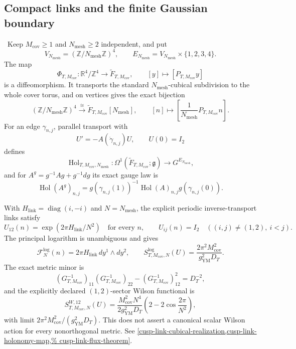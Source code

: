 \subsection{Compact links and the finite Gaussian boundary}

\begin{auditrecord}
\Verified\ Keep \(M_{\mathrm{cov}}\geq1\) and
\(N_{\mathrm{mesh}}\geq2\) independent, and put
\[
 V_{N_{\mathrm{mesh}}}=(\mathbb Z/N_{\mathrm{mesh}}\mathbb Z)^4,
 \qquad
 E_{N_{\mathrm{mesh}}}=V_{N_{\mathrm{mesh}}}\times\{1,2,3,4\}.
\]
The map
\[
 \Phi_{T,M_{\mathrm{cov}}}:\mathbb R^4/\mathbb Z^4
 \longrightarrow\widetilde F_{T,M_{\mathrm{cov}}},\qquad
 [y]\longmapsto[P_{T,M_{\mathrm{cov}}}y]
\]
is a diffeomorphism.  It transports the standard \(N_{\mathrm{mesh}}\)-cubical
subdivision to the whole cover torus, and on vertices gives the exact
bijection
\[
 (\mathbb Z/N_{\mathrm{mesh}}\mathbb Z)^4
 \xrightarrow{\ \cong\ }
 \widetilde F_{T,M_{\mathrm{cov}}}[N_{\mathrm{mesh}}],\qquad
 [n]\longmapsto
 \left[\frac1{N_{\mathrm{mesh}}}P_{T,M_{\mathrm{cov}}}n\right].
\]
For an edge \(\gamma_{n,j}\), parallel transport with
\[
 U'=-A(\dot\gamma_{n,j})U,\qquad U(0)=I_2
\]
defines
\[
 \operatorname{Hol}_{T,M_{\mathrm{cov}},N_{\mathrm{mesh}}}:
 \Omega^1(\widetilde F_{T,M_{\mathrm{cov}}};\mathfrak g)
 \longrightarrow G^{E_{N_{\mathrm{mesh}}}},
\]
and for \(A^g=g^{-1}Ag+g^{-1}dg\) its exact gauge law is
\[
 \operatorname{Hol}(A^g)_{n,j}
 =g(\gamma_{n,j}(1))^{-1}\operatorname{Hol}(A)_{n,j}
  g(\gamma_{n,j}(0)).
\]

With \(H_{\mathrm{link}}=\operatorname{diag}(i,-i)\) and
\(N=N_{\mathrm{mesh}}\), the explicit
periodic inverse-transport links satisfy
\[
 U_{12}(n)=\exp(2\pi H_{\mathrm{link}}/N^2)
 \quad\text{for every }n,
 \qquad U_{ij}(n)=I_2\quad((i,j)\ne(1,2),\ i<j).
\]
The principal logarithm is unambiguous and gives
\[
 \mathcal F_N^{\log}(n)=2\pi H_{\mathrm{link}}\,dy^1\wedge dy^2,
 \qquad
 S^{\log}_{T,M_{\mathrm{cov}},N}(U)
 =\frac{2\pi^2M_{\mathrm{cov}}^2}{g_{\mathrm{YM}}^2D_T}.
\]
The exact metric minor is
\[
 (G_{T,M_{\mathrm{cov}}}^{-1})_{11}
 (G_{T,M_{\mathrm{cov}}}^{-1})_{22}
 -(G_{T,M_{\mathrm{cov}}}^{-1})_{12}^2=D_T^{-2},
\]
and the explicitly declared \((1,2)\)-sector Wilson functional is
\[
 S^{W,12}_{T,M_{\mathrm{cov}},N}(U)
 =\frac{M_{\mathrm{cov}}^2N^4}{2g_{\mathrm{YM}}^2D_T}
 \left(2-2\cos\frac{2\pi}{N^2}\right),
\]
with limit \(2\pi^2M_{\mathrm{cov}}^2/(g_{\mathrm{YM}}^2D_T)\).
This does not assert a canonical scalar Wilson action for every
nonorthogonal metric.  See
\cref{cusp-link-cubical-realization,cusp-link-holonomy-map,%
cusp-link-flux-theorem}.
\end{auditrecord}

